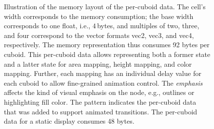 \documentclass[smallextended,natbib]{svjour3}       %
\begin{document}
\begin{figure}[tb]
    \caption{
        Illustration of the memory layout of the per-cuboid data. The cell's width corresponds to the memory consumption; the base width corresponds to one float, i.e., $4$\,bytes, and multiples of two, three, and four correspond to the vector formats vec2, vec3, and vec4, respectively. The memory representation thus consumes 92 bytes per cuboid.
        This per-cuboid data allows representing both a former state and a latter state for area mapping, height mapping, and color mapping. Further, each mapping has an individual delay value for each cuboid to allow fine-grained animation control. The \emph{emphasis} affects the kind of visual emphasis on the node, e.g., outlines or highlighting fill color.
        The pattern indicates the per-cuboid data that was added to support animated transitions.
        The per-cuboid data for a static display consumes 48 bytes.}
    \label{fig:memorylayout}
\end{figure}
\end{document}
